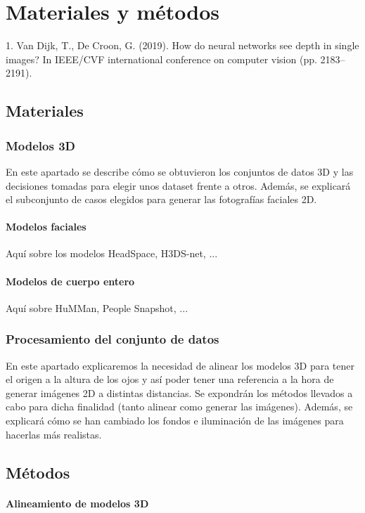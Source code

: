 \chapter{Materiales y métodos}
\thispagestyle{empty}

1. Van Dijk, T.,  De Croon, G. (2019). How do neural networks see depth in single images? In IEEE/CVF international conference on computer vision (pp. 2183–2191).

\section{Materiales}

\subsection{Modelos 3D}
En este apartado se describe cómo se obtuvieron los conjuntos de datos 3D y las decisiones tomadas para elegir unos dataset frente a otros. Además, se explicará el subconjunto de casos elegidos para generar las fotografías faciales 2D.

\subsubsection{Modelos faciales}
Aquí sobre los modelos HeadSpace, H3DS-net, ...

\subsubsection{Modelos de cuerpo entero}
Aquí sobre HuMMan, People Snapshot, ...

\subsection{Procesamiento del conjunto de datos}
En este apartado explicaremos la necesidad de alinear los modelos 3D para tener el origen a la altura de los ojos y así poder tener una referencia a la hora de generar imágenes 2D a distintas distancias. Se expondrán los métodos llevados a cabo para dicha finalidad (tanto alinear como generar las imágenes). Además, se explicará cómo se han cambiado los fondos e iluminación de las imágenes para hacerlas más realistas.

\section{Métodos}

\subsubsection{Alineamiento de modelos 3D}

